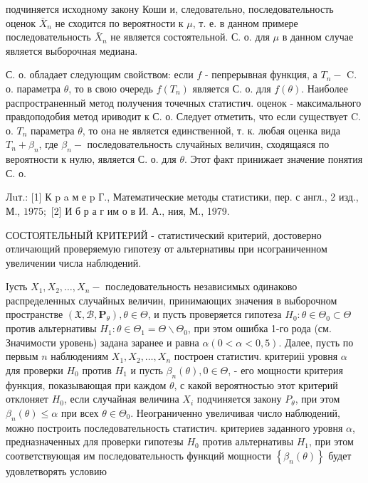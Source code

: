 \documentclass[10pt]{article}
\begin{document}
подчиняется исходному закону Коши и, следовательно, последовательность оценок $\bar{X}_{n}$ не сходится по вероятности к $\mu$, т. е. в данном примере последовательность $\bar{X}_{n}$ не является состоятельной. С. о. для $\mu$ в данном случае является выборочная медиана.



С. о. обладает следующим свойством: если $f$ - пепрерывная функция, а $T_{n}-$ C. о. параметра $\theta$, то в свою очередь $f\left(T_{n}\right)$ является С. о. для $f(\theta)$. Наиболее распространенный метод получения точечных статистич. оценок - максимального правдоподобия метод ириводит к С. о. Следует отметить, что если существует C. о. $T_{n}$ параметра $\theta$, то она не является единственной, т. к. любая оценка вида $T_{n}+\beta_{n}$, где $\beta_{n}-$ последовательность случайных величин, сходящаяся по вероятности к нулю, является С. о. для $\theta$. Этот факт принижает значение понятия С. о.



Лuт.: [1] К p a м е p Г., Математические методы статистики, пер. с англ., 2 изд., М., $1975 ;$ [2] И б р а г им о в И. А., ния, М., 1979.



СОСТОЯТЕЛЬНЫЙ КРИТЕРИЙ - статистический критерий, достоверно отличающий проверяемую гипотезу от альтернативы при нсограниченном увеличении числа наблюдений.



Іусть $X_{1}, X_{2}, \ldots, X_{n}-$ последовательность независимых одинаково распределенных случайных величин, принимающих значения в выборочном пространстве $\left(\mathfrak{X}, \mathscr{B}, \mathbf{P}_{\theta}\right), \theta \in \Theta$, и пусть проверяется гипотеза $H_{0}: \theta \in \Theta_{0} \subset \Theta$ против альтернативы $H_{1}: \theta \in \Theta_{1}=\Theta \backslash \Theta_{0}$, при этом ошибка 1-го рода (см. Значимости уровень) задана заранее и равна $\alpha(0<\alpha<0,5)$. Далее, пусть по первым $n$ наблюдениям $X_{1}, X_{2}, \ldots, X_{n}$ построен статистич. критериіі уровня $\alpha$ для проверки $H_{0}$ против $H_{1}$ и пусть $\beta_{n}(\theta), 0 \in \Theta$, - его мощности критерия функция, показывающая при каждом $\theta$, с какой вероятностью этот критерий отклоняет $H_{0}$, если случайная величина $X_{i}$ подчиняется закону $P_{\theta}$, при этом $\beta_{n}(\theta) \leqslant \alpha$ при всех $\theta \in \Theta_{0}$. Неограниченно увеличивая число наблюдений, можно построить последовательность статистич. критериев заданного уровня $\alpha$, предназначенных для проверки гипотезы $H_{0}$ против альтернативы $H_{1}$, при этом соответствующая им последовательность функций мощности $\left\{\beta_{n}(\theta)\right\}$ будет удовлетворять условию
\end{document}

